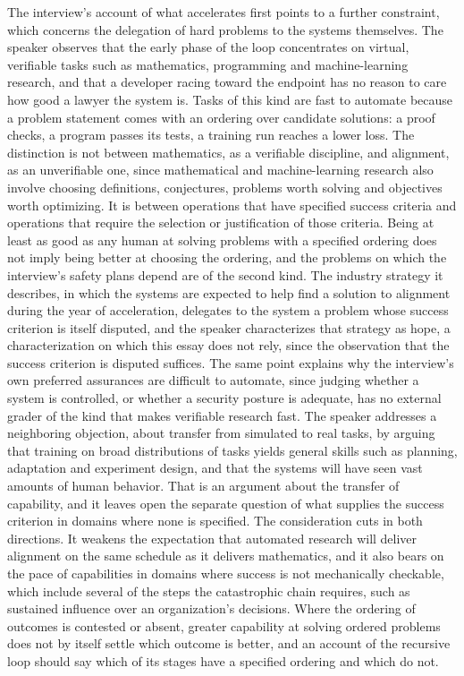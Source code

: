 \documentclass[11pt]{article}
\begin{document}
The interview's account of what accelerates first points to a further constraint, which concerns the delegation of hard problems to the systems themselves. The speaker observes that the early phase of the loop concentrates on virtual, verifiable tasks such as mathematics, programming and machine-learning research, and that a developer racing toward the endpoint has no reason to care how good a lawyer the system is. Tasks of this kind are fast to automate because a problem statement comes with an ordering over candidate solutions: a proof checks, a program passes its tests, a training run reaches a lower loss. The distinction is not between mathematics, as a verifiable discipline, and alignment, as an unverifiable one, since mathematical and machine-learning research also involve choosing definitions, conjectures, problems worth solving and objectives worth optimizing. It is between operations that have specified success criteria and operations that require the selection or justification of those criteria. Being at least as good as any human at solving problems with a specified ordering does not imply being better at choosing the ordering, and the problems on which the interview's safety plans depend are of the second kind. The industry strategy it describes, in which the systems are expected to help find a solution to alignment during the year of acceleration, delegates to the system a problem whose success criterion is itself disputed, and the speaker characterizes that strategy as hope, a characterization on which this essay does not rely, since the observation that the success criterion is disputed suffices. The same point explains why the interview's own preferred assurances are difficult to automate, since judging whether a system is controlled, or whether a security posture is adequate, has no external grader of the kind that makes verifiable research fast. The speaker addresses a neighboring objection, about transfer from simulated to real tasks, by arguing that training on broad distributions of tasks yields general skills such as planning, adaptation and experiment design, and that the systems will have seen vast amounts of human behavior. That is an argument about the transfer of capability, and it leaves open the separate question of what supplies the success criterion in domains where none is specified. The consideration cuts in both directions. It weakens the expectation that automated research will deliver alignment on the same schedule as it delivers mathematics, and it also bears on the pace of capabilities in domains where success is not mechanically checkable, which include several of the steps the catastrophic chain requires, such as sustained influence over an organization's decisions. Where the ordering of outcomes is contested or absent, greater capability at solving ordered problems does not by itself settle which outcome is better, and an account of the recursive loop should say which of its stages have a specified ordering and which do not.
\end{document}
